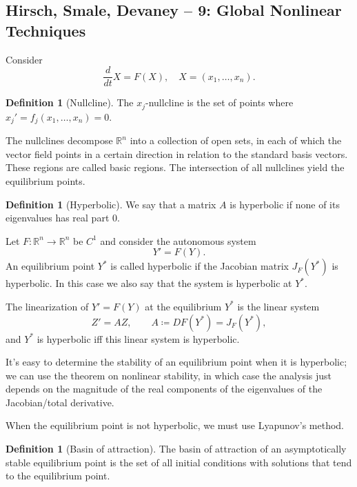 \documentclass{tufte-handout}
\newcommand*\R{\mathbb{R}}
\theoremstyle{definition}
\newtheorem{defn}[thm]{Definition}
\begin{document}
\subsection{Hirsch, Smale, Devaney -- 9: Global Nonlinear Techniques}

Consider \[
	\frac{d}{dt}X = F(X), \quad X = (x_1,\ldots,x_n)
.\]
\begin{defn}[Nullcline]
	The $x_j$-nullcline is the set of points where $x_j' = f_j(x_1,\ldots,x_n) = 0$.
\end{defn}

The nullclines decompose $\R^n$ into a collection of open sets, in each of which the vector field points in a certain direction in relation to the standard basis vectors. These regions are called basic regions. The intersection of all nullclines yield the equilibrium points. 

\begin{defn}[Hyperbolic]
	We say that a matrix $A$ is hyperbolic if none of its eigenvalues has real part $0$.

	Let $F : \R^n \to \R^n$ be $C^1$ and consider the autonomous system
  \[
    Y' = F(Y).
	\]
	An equilibrium point $Y^*$ is called hyperbolic if the Jacobian matrix $J_F(Y^*)$
	is hyperbolic. In this case we also say that the system is hyperbolic at $Y^*$.

	The linearization of $Y' = F(Y)$ at the equilibrium $Y^*$ is the linear system
	\[
	  Z' = A Z, \qquad A \coloneqq D F(Y^*) = J_F(Y^*),
	\]
	and $Y^*$ is hyperbolic iff this linear system is hyperbolic.

\end{defn}

It's easy to determine the stability of an equilibrium point when it is hyperbolic; we can use the theorem on nonlinear stability, in which case the analysis just depends on the magnitude of the real components of the eigenvalues of the Jacobian/total derivative.

When the equilibrium point is not hyperbolic, we must use Lyapunov's method.

\begin{defn}[Basin of attraction]
	The basin of attraction of an asymptotically stable equilibrium point is the set of all initial conditions with solutions that tend to the equilibrium point.
\end{defn}
\end{document}
